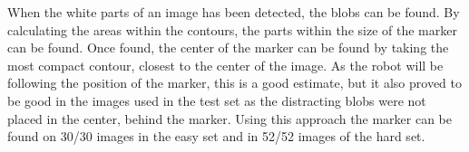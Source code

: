 When the white parts of an image has been detected, the blobs can be found.
By calculating the areas within the contours, the parts within the size of the marker can be found.
Once found, the center of the marker can be found by taking the most compact contour, closest to the center of the image.
As the robot will be following the position of the marker, this is a good estimate, but it also proved to be good in the images used in the test set as the distracting blobs were not placed in the center, behind the marker.
Using this approach the marker can be found on 30/30 images in the easy set and in 52/52 images of the hard set.

